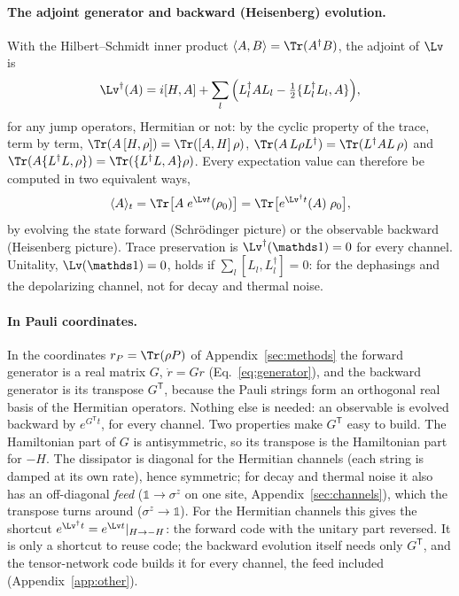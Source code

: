 \paragraph{The adjoint generator and backward (Heisenberg) evolution.} With the Hilbert--Schmidt inner product $\langle A, B\rangle = \Tr(A^\dagger B)$, the adjoint of $\Lv$ is
\begin{equation}
\Lv^\dagger(A) = i[H, A] + \sum_l\Big(L_l^\dagger A L_l - \tfrac12\{L_l^\dagger L_l, A\}\Big),
\end{equation}
for any jump operators, Hermitian or not: by the cyclic property of the trace, term by term, $\Tr(A\,[H,\rho]) = \Tr([A,H]\,\rho)$, $\Tr(A\,L\rho L^\dagger) = \Tr(L^\dagger AL\,\rho)$ and $\Tr(A\{L^\dagger L, \rho\}) = \Tr(\{L^\dagger L, A\}\rho)$. Every expectation value can therefore be computed in two equivalent ways,
\begin{equation}
\langle A\rangle_t = \Tr\big[A\;e^{\Lv t}(\rho_0)\big] = \Tr\big[e^{\Lv^\dagger t}(A)\;\rho_0\big],
\label{eq:duality}
\end{equation}
by evolving the state forward (Schr\"odinger picture) or the observable backward (Heisenberg picture). Trace preservation is $\Lv^\dagger(\mathds 1) = 0$ for every channel. Unitality, $\Lv(\mathds 1) = 0$, holds if $\sum_l[L_l, L_l^\dagger] = 0$: for the dephasings and the depolarizing channel, not for decay and thermal noise.

\paragraph{In Pauli coordinates.} In the coordinates $r_P = \Tr(\rho P)$ of Appendix~\ref{sec:methods} the forward generator is a real matrix $G$, $\dot r = Gr$ (Eq.~\eqref{eq:generator}), and the backward generator is its transpose $G^{\mathsf T}$, because the Pauli strings form an orthogonal real basis of the Hermitian operators. Nothing else is needed: an observable is evolved backward by $e^{G^{\mathsf T}t}$, for every channel. Two properties make $G^{\mathsf T}$ easy to build. The Hamiltonian part of $G$ is antisymmetric, so its transpose is the Hamiltonian part for $-H$. The dissipator is diagonal for the Hermitian channels (each string is damped at its own rate), hence symmetric; for decay and thermal noise it also has an off-diagonal \emph{feed} ($\mathds 1 \to \sigma^z$ on one site, Appendix~\ref{sec:channels}), which the transpose turns around ($\sigma^z \to \mathds 1$). For the Hermitian channels this gives the shortcut $e^{\Lv^\dagger t} = e^{\Lv t}|_{H\to-H}$: the forward code with the unitary part reversed. It is only a shortcut to reuse code; the backward evolution itself needs only $G^{\mathsf T}$, and the tensor-network code builds it for every channel, the feed included (Appendix~\ref{app:other}).

